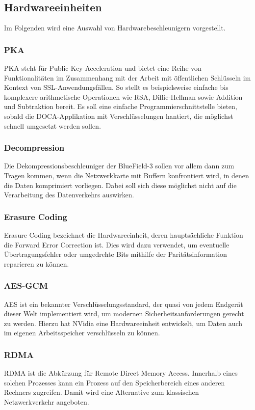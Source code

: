 \subsection{Hardwareeinheiten}
Im Folgenden wird eine Auswahl von Hardwarebeschleunigern vorgestellt.
\subsubsection{PKA}
PKA steht für Public-Key-Acceleration und bietet eine Reihe von Funktionalitäten im Zusammenhang mit der Arbeit mit öffentlichen Schlüsseln im Kontext von SSL-Anwendungsfällen. So stellt es beispielsweise einfache bis komplexere arithmetische Operationen wie RSA, Diffie-Hellman sowie Addition und Subtraktion bereit. Es soll eine einfache Programmierschnittstelle bieten, sobald die DOCA-Applikation mit Verschlüsselungen hantiert, die möglichst schnell umgesetzt werden sollen.
\subsubsection{Decompression}
Die Dekompressionsbeschleuniger der BlueField-3 sollen vor allem dann zum Tragen kommen, wenn die Netzwerkkarte mit Buffern konfrontiert wird, in denen die Daten komprimiert vorliegen. Dabei soll sich diese möglichst nicht auf die Verarbeitung des Datenverkehrs auswirken.
\subsubsection{Erasure Coding}
Erasure Coding bezeichnet die Hardwareeinheit, deren hauptsächliche Funktion die Forward Error Correction ist. Dies wird dazu verwendet, um eventuelle Übertragungsfehler oder umgedrehte Bits mithilfe der Paritätsinformation reparieren zu können.
\subsubsection{AES-GCM}
AES ist ein bekannter Verschlüsselungsstandard, der quasi von jedem Endgerät dieser Welt implementiert wird, um modernen Sicherheitsanforderungen gerecht zu werden. Hierzu hat NVidia eine Hardwareeinheit entwickelt, um Daten auch im eigenen Arbeitsspeicher verschlüsseln zu können.
\subsubsection{RDMA}
RDMA ist die Abkürzung für Remote Direct Memory Access. Innerhalb eines solchen Prozesses kann ein Prozess auf den Speicherbereich eines anderen Rechners zugreifen. Damit wird eine Alternative zum klassischen Netzwerkverkehr angeboten.
